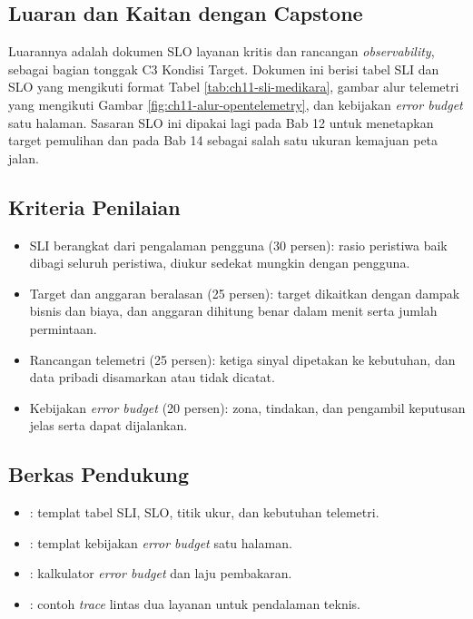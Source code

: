 \subsection*{Luaran dan Kaitan dengan Capstone}

Luarannya adalah dokumen SLO layanan kritis dan rancangan \textit{observability}, sebagai bagian
tonggak C3 Kondisi Target. Dokumen ini berisi tabel SLI dan SLO yang mengikuti format Tabel
\ref{tab:ch11-sli-medikara}, gambar alur telemetri yang mengikuti Gambar
\ref{fig:ch11-alur-opentelemetry}, dan kebijakan \textit{error budget} satu halaman. Sasaran SLO
ini dipakai lagi pada Bab 12 untuk menetapkan target pemulihan dan pada Bab 14 sebagai salah satu
ukuran kemajuan peta jalan.

\subsection*{Kriteria Penilaian}

\begin{itemize}
  \item SLI berangkat dari pengalaman pengguna (30 persen): rasio peristiwa baik dibagi seluruh
        peristiwa, diukur sedekat mungkin dengan pengguna.
  \item Target dan anggaran beralasan (25 persen): target dikaitkan dengan dampak bisnis dan biaya,
        dan anggaran dihitung benar dalam menit serta jumlah permintaan.
  \item Rancangan telemetri (25 persen): ketiga sinyal dipetakan ke kebutuhan, dan data pribadi
        disamarkan atau tidak dicatat.
  \item Kebijakan \textit{error budget} (20 persen): zona, tindakan, dan pengambil keputusan jelas
        serta dapat dijalankan.
\end{itemize}

\subsection*{Berkas Pendukung}

\begin{itemize}
  \item {}: templat tabel SLI, SLO, titik ukur, dan
        kebutuhan telemetri.
  \item {}: templat kebijakan
        \textit{error budget} satu halaman.
  \item {}: kalkulator \textit{error budget} dan
        laju pembakaran.
  \item {}: contoh \textit{trace} lintas dua
        layanan untuk pendalaman teknis.
\end{itemize}

